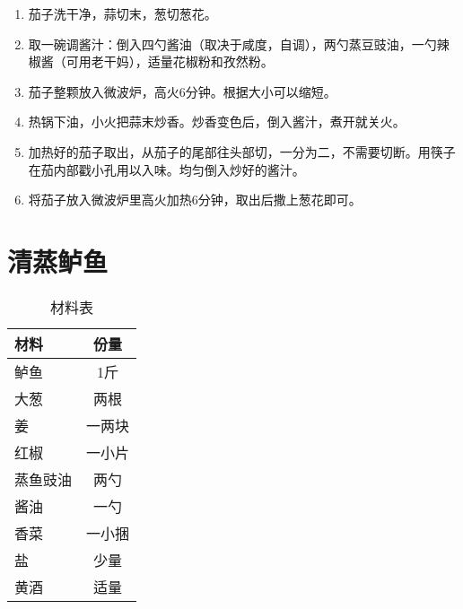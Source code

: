 \begin{enumerate}
    \item 茄子洗干净，蒜切末，葱切葱花。
 
    \item 取一碗调酱汁：倒入四勺酱油（取决于咸度，自调），两勺蒸豆豉油，一勺辣椒酱（可用老干妈），适量花椒粉和孜然粉。
     
    \item 茄子整颗放入微波炉，高火6分钟。根据大小可以缩短。
  
    \item 热锅下油，小火把蒜末炒香。炒香变色后，倒入酱汁，煮开就关火。
    
    \item 加热好的茄子取出，从茄子的尾部往头部切，一分为二，不需要切断。用筷子在茄内部戳小孔用以入味。均匀倒入炒好的酱汁。
    
    \item 将茄子放入微波炉里高火加热6分钟，取出后撒上葱花即可。
\end{enumerate}



\section{清蒸鲈鱼}

\begin{table}[H]
    \centering
    \begin{tabular}{|l||c|}\hline
     \textbf{材料}    &  \textbf{份量}\\ \hline\hline
    鲈鱼    &  1斤 \\ \hline
    大葱    & 两根 \\ \hline
    姜     &  一两块\\ \hline
    红椒   &  一小片\\ \hline
    蒸鱼豉油 &  两勺\\ \hline
    酱油 &  一勺\\ \hline
    香菜  & 一小捆\\ \hline
    盐  & 少量 \\ \hline
    黄酒  &  适量\\ \hline
    \end{tabular}
    \caption{材料表}
\end{table}

